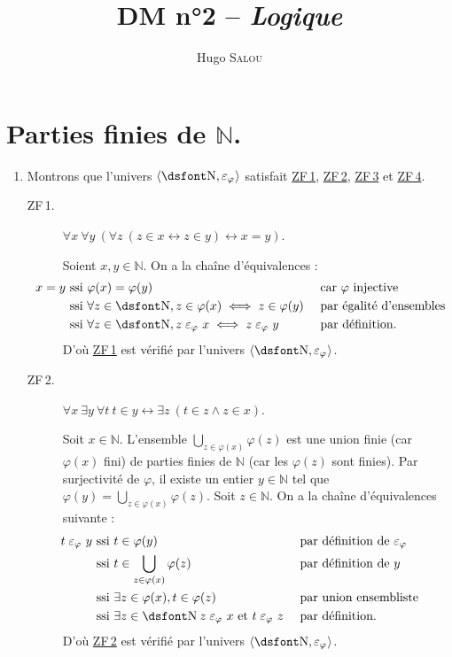 \documentclass{../notes}
\title{DM n°2 -- \itshape Logique}
\author{Hugo \scshape Salou}
\newcommand\zf[1]{\hyperref[ZF#1]{\textsf{ZF\,#1}}}
\newcommand\inphi[1][\relax]{\ensuremath{\mathrel{\varepsilon_{\varphi_{#1}}}}}
\begin{document}
  \maketitle

  \chapter{Parties finies de $\mathds{N}$.}

  \begin{enumerate}
    \item Montrons que l'univers $\langle \mathds{N}, {\inphi} \rangle$ satisfait \zf 1, \zf 2, \zf 3 et \zf 4.
      \begin{description}
        \item[ZF\,1.] \label{ZF1}
          $\forall x\: \forall y\: (\forall z \: (z \in x \leftrightarrow z \in y) \leftrightarrow x = y)$.

          Soient $x, y \in \mathds{N}$. On a la chaîne d'équivalences :
          \begin{align*}
            \hspace{-5em}
            x = y & \text{ ssi } \varphi(x) = \varphi(y) && \text{ car $\varphi$ injective }\\
                  & \text{ ssi } \forall z \in \mathds{N}, z \in \varphi(x) \iff z \in \varphi(y) && \text{ par égalité d'ensembles }\\
                  & \text{ ssi } \forall z \in \mathds{N}, z \inphi x \iff z \inphi y && \text{ par définition}
          .\end{align*}
          D'où \zf 1 est vérifié par l'univers $\langle \mathds{N}, \inphi \rangle$.

        \item[ZF\,2.] \label{ZF2} $\forall  x \: \exists  y \: \forall  t \: t \in y \leftrightarrow \exists  z \: (t \in z \land z \in x)$.

          Soit $x \in \mathds{N}$. L'ensemble $\bigcup_{z \in \varphi(x)} \varphi(z)$ est une union finie (car $\varphi(x)$ fini) de parties finies de $\mathds{N}$ (car les $\varphi(z)$ sont finies).
          Par surjectivité de $\varphi$, il existe un entier $y \in \mathds{N}$ tel que $\varphi(y) = \bigcup_{z \in \varphi(x)} \varphi(z)$.
          Soit $z \in \mathds{N}$. On a la chaîne d'équivalences suivante :
          \begin{align*}
            \hspace{-5em}
            t \inphi y & \text{ ssi } t \in \varphi(y) && \text{ par définition de $\inphi$ }\\
                       & \text{ ssi } t \in \bigcup_{z \in \varphi(x)} \varphi(z) && \text{ par définition de $y$ }\\
                       & \text{ ssi } \exists z \in \varphi(x), t \in \varphi(z) && \text{ par union ensembliste }\\
                       & \text{ ssi } \exists z \in \mathds{N} \: z \inphi x \text{ et } t \inphi z && \text{ par définition}
          .\end{align*}
          D'où \zf 2 est vérifié par l'univers $\langle \mathds{N}, \inphi \rangle$.


\end{description}
\end{enumerate}
\end{document}
